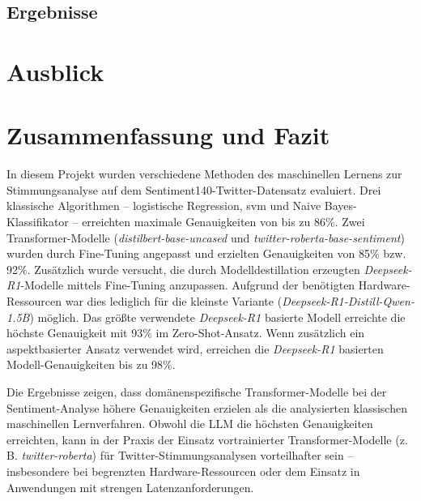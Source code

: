 \documentclass[researchlab,group,]{AIGpaper}
\begin{document}
\subsection{Ergebnisse}

\section{Ausblick}

\section{Zusammenfassung und Fazit}

In diesem Projekt wurden verschiedene Methoden des maschinellen Lernens zur Stimmungsanalyse auf dem Sentiment140-Twitter-Datensatz evaluiert. 
Drei klassische Algorithmen – logistische Regression, \gls{svm} und Naive Bayes-Klassifikator – erreichten maximale Genauigkeiten von bis zu 86\%. 
Zwei Transformer-Modelle (\emph{distilbert-base-uncased} und \emph{twitter-roberta-base-sentiment}) wurden durch Fine-Tuning angepasst und erzielten Genauigkeiten von 85\% bzw. 92\%. 
Zusätzlich wurde versucht, die durch Modelldestillation erzeugten \emph{Deepseek-R1}-Modelle mittels Fine-Tuning anzupassen. Aufgrund der benötigten Hardware-Ressourcen war dies lediglich für die kleinste Variante (\emph{Deepseek-R1-Distill-Qwen-1.5B}) möglich. 
Das größte verwendete \emph{Deepseek-R1} basierte Modell erreichte die höchste Genauigkeit mit 93\% im Zero-Shot-Ansatz. 
Wenn zusätzlich ein aspektbasierter Ansatz verwendet wird, erreichen die \emph{Deepseek-R1} basierten Modell-Genauigkeiten bis zu 98\%.

Die Ergebnisse zeigen, dass domänenspezifische Transformer-Modelle bei der Sentiment-Analyse höhere Genauigkeiten erzielen als die analysierten klassischen maschinellen Lernverfahren. 
Obwohl die LLM die höchsten Genauigkeiten erreichten, kann in der Praxis der Einsatz vortrainierter Transformer-Modelle (z. B. \emph{twitter-roberta}) für Twitter-Stimmungsanalysen vorteilhafter sein – insbesondere bei begrenzten Hardware-Ressourcen oder dem Einsatz in Anwendungen mit strengen Latenzanforderungen.

\newpage
\addreferences

\end{document}
